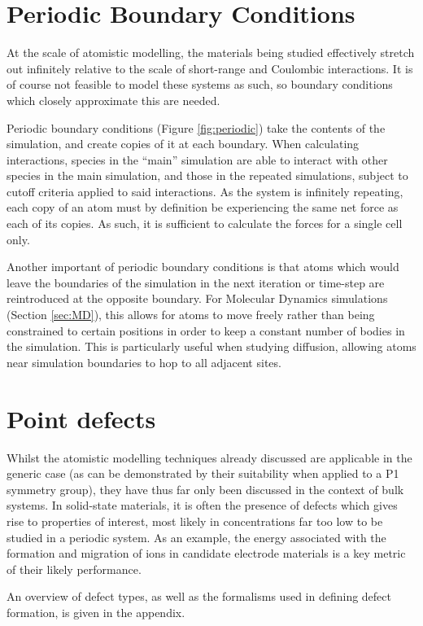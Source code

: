 \section{Periodic Boundary Conditions}
At the scale of atomistic modelling, the materials being studied effectively stretch out infinitely relative to the scale of short-range and Coulombic interactions.
It is of course not feasible to model these systems as such, so boundary conditions which closely approximate this are needed.

Periodic boundary conditions (Figure \ref{fig:periodic}) take the contents of the simulation, and create copies of it at each boundary.
When calculating interactions, species in the ``main'' simulation are able to interact with other species in the main simulation, and those in the repeated simulations, subject to cutoff criteria applied to said interactions.
As the system is infinitely repeating, each copy of an atom must by definition be experiencing the same net force as each of its copies.
As such, it is sufficient to calculate the forces for a single cell only.

Another important of periodic boundary conditions is that atoms which would leave the boundaries of the simulation in the next iteration or time-step are reintroduced at the opposite boundary.
For Molecular Dynamics simulations (Section \ref{sec:MD}), this allows for atoms to move freely rather than being constrained to certain positions in order to keep a constant number of bodies in the simulation.
This is particularly useful when studying diffusion, allowing atoms near simulation boundaries to hop to all adjacent sites.


\newpage


\section{Point defects}
Whilst the atomistic modelling techniques already discussed are applicable in the generic case (as can be demonstrated by their suitability when applied to a P1 symmetry group), they have thus far only been discussed in the context of bulk systems.
In solid-state materials, it is often the presence of defects which gives rise to properties of interest, most likely in concentrations far too low to be studied in a periodic system.
As an example, the energy associated with the formation and migration of  ions in candidate electrode materials is a key metric of their likely performance.

An overview of defect types, as well as the formalisms used in defining defect formation, is given in the appendix.

